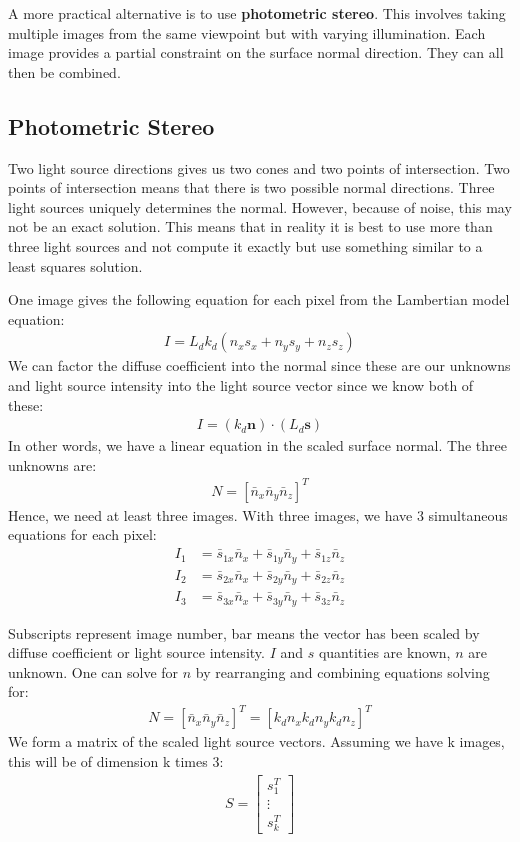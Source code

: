 \documentclass{article}
\begin{document}
A more practical alternative is to use \textbf{photometric stereo}.
This involves taking multiple images from the same viewpoint but with varying illumination.
Each image provides a partial constraint on the surface normal direction.
They can all then be combined.

\subsection{Photometric Stereo}
Two light source directions gives us two cones and two points of intersection.
Two points of intersection means that there is two possible normal directions.
Three light sources uniquely determines the normal.
However, because of noise, this may not be an exact solution.
This means that in reality it is best to use more than three light sources and not compute it exactly but use something similar to a least squares solution.

One image gives the following equation for each pixel from the Lambertian model equation:
\begin{align*}
	I = L_dk_d(n_xs_x + n_ys_y + n_zs_z)
\end{align*}
We can factor the diffuse coefficient into the normal since these are our unknowns and light source intensity into the light source vector since we know both of these:
\begin{align*}
	I = (k_d\textbf{n})\cdot(L_d\textbf{s})
\end{align*}
In other words, we have a linear equation in the scaled surface normal.
The three unknowns are:
\begin{align*}
	N = {[\bar{n}_x \bar{n}_y \bar{n}_z]}^T
\end{align*}
Hence, we need at least three images.
With three images, we have 3 simultaneous equations for each pixel:
\begin{align*}
	I_1 &= \bar{s}_{1x}\bar{n}_x + \bar{s}_{1y}\bar{n}_y + \bar{s}_{1z}\bar{n}_z  \\
	I_2 &= \bar{s}_{2x}\bar{n}_x + \bar{s}_{2y}\bar{n}_y + \bar{s}_{2z}\bar{n}_z  \\
	I_3 &= \bar{s}_{3x}\bar{n}_x + \bar{s}_{3y}\bar{n}_y + \bar{s}_{3z}\bar{n}_z  
\end{align*}

Subscripts represent image number, bar means the vector has been scaled by diffuse coefficient or light source intensity.
$I$ and $s$ quantities are known, $n$ are unknown.
One can solve for $n$ by rearranging and combining equations solving for:
\begin{align*}
	N = {[\bar{n}_x \bar{n}_y \bar{n}_z]}^T = [k_dn_x k_dn_y k_dn_z]^T
\end{align*}
We form a matrix of the scaled light source vectors.
Assuming we have k images, this will be of dimension k times 3:
\begin{align*}
S = 
	\begin{bmatrix}
		s^T_1 \\
		\vdots \\
		s^T_k
	\end{bmatrix}
\end{align*}
\end{document}
